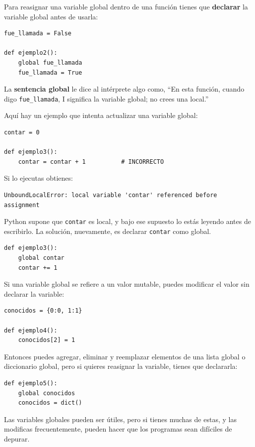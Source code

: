 \documentclass[10pt]{book}
\begin{document}
Para reasignar una variable global dentro de una función tienes que
{\bf declarar} la variable global antes de usarla:

\begin{verbatim}
fue_llamada = False

def ejemplo2():
    global fue_llamada
    fue_llamada = True
\end{verbatim}
%
La {\bf sentencia global} le dice al intérprete
algo como, ``En esta función, cuando digo \verb"fue_llamada", I
significa la variable global; no crees una local.''

Aquí hay un ejemplo que intenta actualizar una variable global:

\begin{verbatim}
contar = 0

def ejemplo3():
    contar = contar + 1          # INCORRECTO
\end{verbatim}
%
Si lo ejecutas obtienes:

\begin{verbatim}
UnboundLocalError: local variable 'contar' referenced before assignment
\end{verbatim}
%
Python supone que {\tt contar} es local, y bajo ese supuesto
lo estás leyendo antes de escribirlo.  La solución, nuevamente,
es declarar {\tt contar} como global.

\begin{verbatim}
def ejemplo3():
    global contar
    contar += 1
\end{verbatim}
%
Si una variable global se refiere a un valor mutable, puedes modificar
el valor sin declarar la variable:

\begin{verbatim}
conocidos = {0:0, 1:1}

def ejemplo4():
    conocidos[2] = 1
\end{verbatim}
%
Entonces puedes agregar, eliminar y reemplazar elementos de una lista global o diccionario
global, pero si quieres reasignar la variable,
tienes que declararla:

\begin{verbatim}
def ejemplo5():
    global conocidos
    conocidos = dict()
\end{verbatim}
%
Las variables globales pueden ser útiles, pero si tienes muchas de estas,
y las modificas frecuentemente, pueden hacer que los programas sean
difíciles de depurar.
\end{document}
